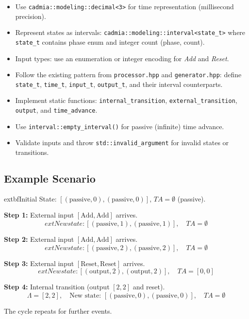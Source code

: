 \begin{itemize}
    \item Use \texttt{cadmia::modeling::decimal<3>} for time representation (millisecond precision).
    \item Represent states as intervals: \texttt{cadmia::modeling::interval<state\_t>} where \texttt{state\_t} contains phase enum and integer count (phase, count).
    \item Input types: use an enumeration or integer encoding for \textit{Add} and \textit{Reset}.
    \item Follow the existing pattern from \texttt{processor.hpp} and \texttt{generator.hpp}: define \texttt{state\_t}, \texttt{time\_t}, \texttt{input\_t}, \texttt{output\_t}, and their interval counterparts.
    \item Implement static functions: \texttt{internal\_transition}, \texttt{external\_transition}, \texttt{output}, and \texttt{time\_advance}.
    \item Use \texttt{interval::empty\_interval()} for passive (infinite) time advance.
    \item Validate inputs and throw \texttt{std::invalid\_argument} for invalid states or transitions.
\end{itemize}

\subsection{Example Scenario}

	extbf{Initial State:} $[(\text{passive}, 0), (\text{passive}, 0)]$, $TA = \emptyset$ (passive).

\textbf{Step 1:} External input $[\text{Add}, \text{Add}]$ arrives.
\[
	ext{New state: } [(\text{passive}, 1), (\text{passive}, 1)], \quad TA = \emptyset
\]

\textbf{Step 2:} External input $[\text{Add}, \text{Add}]$ arrives.
\[
	ext{New state: } [(\text{passive}, 2), (\text{passive}, 2)], \quad TA = \emptyset
\]

\textbf{Step 3:} External input $[\text{Reset}, \text{Reset}]$ arrives.
\[
	ext{New state: } [(\text{output}, 2), (\text{output}, 2)], \quad TA = [0, 0]
\]

\textbf{Step 4:} Internal transition (output $[2, 2]$ and reset).
\[
\Lambda = [2, 2], \quad \text{New state: } [(\text{passive}, 0), (\text{passive}, 0)], \quad TA = \emptyset
\]

The cycle repeats for further events.

